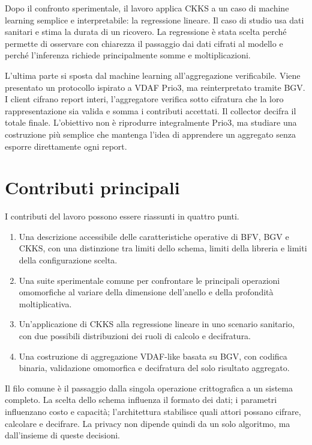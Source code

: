 Dopo il confronto sperimentale, il lavoro applica CKKS a un caso di machine learning semplice e interpretabile: la regressione lineare. Il caso di studio usa dati sanitari e stima la durata di un ricovero. La regressione \`e stata scelta perch\'e permette di osservare con chiarezza il passaggio dai dati cifrati al modello e perch\'e l'inferenza richiede principalmente somme e moltiplicazioni.

L'ultima parte si sposta dal machine learning all'aggregazione verificabile. Viene presentato un protocollo ispirato a VDAF Prio3, ma reinterpretato tramite BGV. I client cifrano report interi, l'aggregatore verifica sotto cifratura che la loro rappresentazione sia valida e somma i contributi accettati. Il collector decifra il totale finale. L'obiettivo non \`e riprodurre integralmente Prio3, ma studiare una costruzione pi\`u semplice che mantenga l'idea di apprendere un aggregato senza esporre direttamente ogni report.

\section{Contributi principali}
I contributi del lavoro possono essere riassunti in quattro punti.

\begin{enumerate}
  \item Una descrizione accessibile delle caratteristiche operative di BFV, BGV e CKKS, con una distinzione tra limiti dello schema, limiti della libreria e limiti della configurazione scelta.
  \item Una suite sperimentale comune per confrontare le principali operazioni omomorfiche al variare della dimensione dell'anello e della profondit\`a moltiplicativa.
  \item Un'applicazione di CKKS alla regressione lineare in uno scenario sanitario, con due possibili distribuzioni dei ruoli di calcolo e decifratura.
  \item Una costruzione di aggregazione VDAF-like basata su BGV, con codifica binaria, validazione omomorfica e decifratura del solo risultato aggregato.
\end{enumerate}

Il filo comune \`e il passaggio dalla singola operazione crittografica a un sistema completo. La scelta dello schema influenza il formato dei dati; i parametri influenzano costo e capacit\`a; l'architettura stabilisce quali attori possano cifrare, calcolare e decifrare. La privacy non dipende quindi da un solo algoritmo, ma dall'insieme di queste decisioni.
